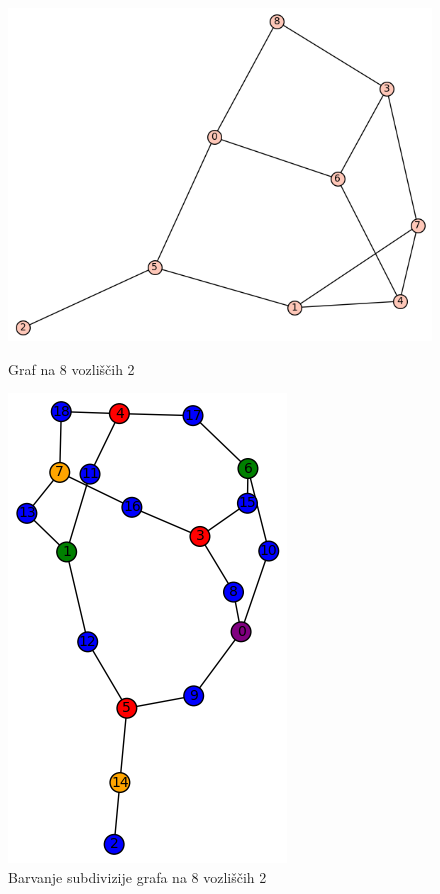 \documentclass[11pt,a4paper,titlepage]{article}
\begin{document}
\begin{figure}[h]
\centering
\begin{minipage}{0.45\textwidth}
	\centering
	\includegraphics[width=\linewidth]{orig_8_2.png}
	\caption{Graf na 8 vozliščih 2}
\end{minipage}
\hfill
\begin{minipage}{0.45\textwidth}
	\centering
	\includegraphics[scale=0.6]{sub_8_2.png}
	\caption{Barvanje subdivizije grafa na 8 vozliščih 2}
\end{minipage}
\end{figure}
\end{document}
